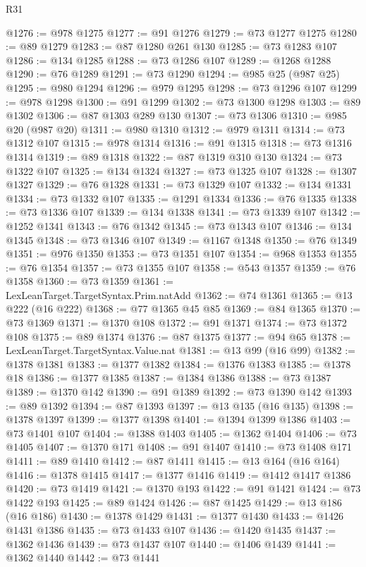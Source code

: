 \begin{lexlean}{R31}
\begin{coremodule}
@1276 := @978 @1275
@1277 := @91 @1276
@1279 := @73 @1277 @1275
@1280 := @89 @1279
@1283 := @87 @1280 @261 @130
@1285 := @73 @1283 @107
@1286 := @134 @1285
@1288 := @73 @1286 @107
@1289 := @1268 @1288
@1290 := @76 @1289
@1291 := @73 @1290
@1294 := @985 @25 (@987 @25)
@1295 := @980 @1294
@1296 := @979 @1295
@1298 := @73 @1296 @107
@1299 := @978 @1298
@1300 := @91 @1299
@1302 := @73 @1300 @1298
@1303 := @89 @1302
@1306 := @87 @1303 @289 @130
@1307 := @73 @1306
@1310 := @985 @20 (@987 @20)
@1311 := @980 @1310
@1312 := @979 @1311
@1314 := @73 @1312 @107
@1315 := @978 @1314
@1316 := @91 @1315
@1318 := @73 @1316 @1314
@1319 := @89 @1318
@1322 := @87 @1319 @310 @130
@1324 := @73 @1322 @107
@1325 := @134 @1324
@1327 := @73 @1325 @107
@1328 := @1307 @1327
@1329 := @76 @1328
@1331 := @73 @1329 @107
@1332 := @134 @1331
@1334 := @73 @1332 @107
@1335 := @1291 @1334
@1336 := @76 @1335
@1338 := @73 @1336 @107
@1339 := @134 @1338
@1341 := @73 @1339 @107
@1342 := @1252 @1341
@1343 := @76 @1342
@1345 := @73 @1343 @107
@1346 := @134 @1345
@1348 := @73 @1346 @107
@1349 := @1167 @1348
@1350 := @76 @1349
@1351 := @976 @1350
@1353 := @73 @1351 @107
@1354 := @968 @1353
@1355 := @76 @1354
@1357 := @73 @1355 @107
@1358 := @543 @1357
@1359 := @76 @1358
@1360 := @73 @1359
@1361 := LexLeanTarget.TargetSyntax.Prim.natAdd
@1362 := @74 @1361
@1365 := @13 @222 (@16 @222)
@1368 := @77 @1365 @45 @85
@1369 := @84 @1365
@1370 := @73 @1369
@1371 := @1370 @108
@1372 := @91 @1371
@1374 := @73 @1372 @108
@1375 := @89 @1374
@1376 := @87 @1375
@1377 := @94 @65
@1378 := LexLeanTarget.TargetSyntax.Value.nat
@1381 := @13 @99 (@16 @99)
@1382 := @1378 @1381
@1383 := @1377 @1382
@1384 := @1376 @1383
@1385 := @1378 @18
@1386 := @1377 @1385
@1387 := @1384 @1386
@1388 := @73 @1387
@1389 := @1370 @142
@1390 := @91 @1389
@1392 := @73 @1390 @142
@1393 := @89 @1392
@1394 := @87 @1393
@1397 := @13 @135 (@16 @135)
@1398 := @1378 @1397
@1399 := @1377 @1398
@1401 := @1394 @1399 @1386
@1403 := @73 @1401 @107
@1404 := @1388 @1403
@1405 := @1362 @1404
@1406 := @73 @1405
@1407 := @1370 @171
@1408 := @91 @1407
@1410 := @73 @1408 @171
@1411 := @89 @1410
@1412 := @87 @1411
@1415 := @13 @164 (@16 @164)
@1416 := @1378 @1415
@1417 := @1377 @1416
@1419 := @1412 @1417 @1386
@1420 := @73 @1419
@1421 := @1370 @193
@1422 := @91 @1421
@1424 := @73 @1422 @193
@1425 := @89 @1424
@1426 := @87 @1425
@1429 := @13 @186 (@16 @186)
@1430 := @1378 @1429
@1431 := @1377 @1430
@1433 := @1426 @1431 @1386
@1435 := @73 @1433 @107
@1436 := @1420 @1435
@1437 := @1362 @1436
@1439 := @73 @1437 @107
@1440 := @1406 @1439
@1441 := @1362 @1440
@1442 := @73 @1441

\end{coremodule}
\end{lexlean}
